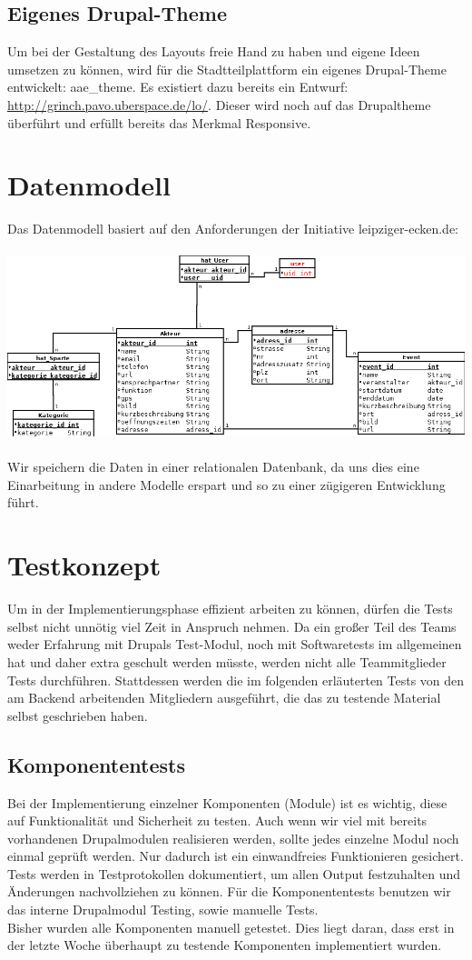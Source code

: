 \documentclass{swp}
\begin{document}
\subsection{Eigenes Drupal-Theme}
Um bei der Gestaltung des Layouts freie Hand zu haben und eigene Ideen umsetzen zu k\"onnen, wird f\"ur die Stadtteilplattform ein eigenes Drupal-Theme entwickelt: aae\_{}theme. Es existiert dazu bereits ein Entwurf: \url{http://grinch.pavo.uberspace.de/lo/}. Dieser wird noch auf das Drupaltheme \"uberf\"uhrt und erf\"ullt bereits das Merkmal \glqq Responsive\grqq{}.
\section{Datenmodell}
Das Datenmodell basiert auf den Anforderungen der Initiative leipziger-ecken.de:\\\\
\includegraphics[width=\textwidth]{Datenmodell2.png}\\\\
Wir speichern die Daten in einer relationalen Datenbank, da uns dies eine Einarbeitung in andere Modelle erspart und so zu einer z\"ugigeren Entwicklung f\"uhrt.
\section{Testkonzept}
Um in der Implementierungsphase effizient arbeiten zu k\"onnen, d\"urfen die Tests selbst nicht unn\"otig viel Zeit in Anspruch nehmen. Da ein gro{\ss}er Teil des Teams weder Erfahrung mit Drupals Test-Modul, noch mit Softwaretests im allgemeinen hat und daher extra geschult werden m\"usste, werden nicht alle Teammitglieder Tests durchf\"uhren. Stattdessen werden die im folgenden erl\"auterten Tests von den am Backend arbeitenden Mitgliedern ausgef\"uhrt, die das zu testende Material selbst geschrieben haben.
\subsection{Komponententests}
Bei der Implementierung einzelner Komponenten (Module) ist es wichtig, diese auf Funktionalit\"at und Sicherheit zu testen. Auch wenn wir viel mit bereits vorhandenen Drupalmodulen realisieren werden, sollte jedes einzelne Modul noch einmal gepr\"uft werden. Nur dadurch ist ein einwandfreies Funktionieren gesichert. Tests werden in Testprotokollen dokumentiert, um allen Output festzuhalten und \"Anderungen nachvollziehen zu k\"onnen. F\"ur die Komponententests benutzen wir das interne Drupalmodul \glqq Testing\grqq{}, sowie manuelle Tests. \\
Bisher wurden alle Komponenten manuell getestet. Dies liegt daran, dass erst in der letzte Woche \"uberhaupt zu testende Komponenten implementiert wurden.
\end{document}
